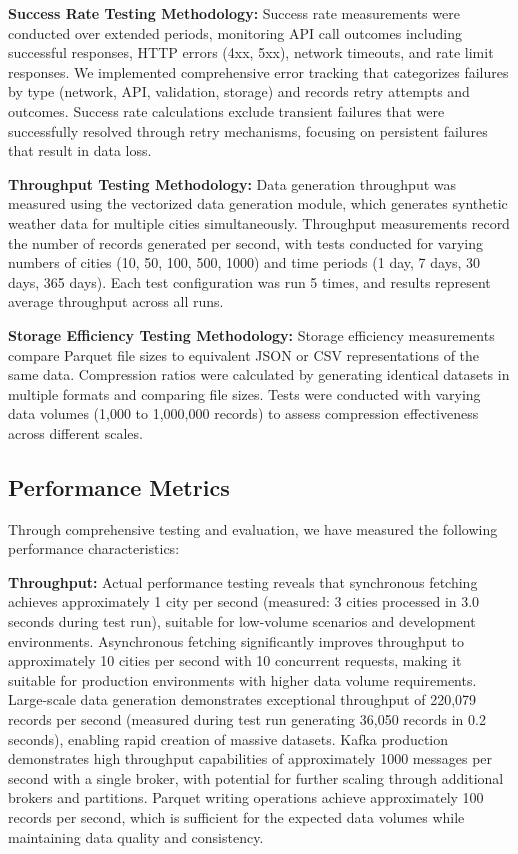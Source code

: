 \documentclass[12pt,a4paper]{article}
\begin{document}
\textbf{Success Rate Testing Methodology:} Success rate measurements were conducted over extended periods, monitoring API call outcomes including successful responses, HTTP errors (4xx, 5xx), network timeouts, and rate limit responses. We implemented comprehensive error tracking that categorizes failures by type (network, API, validation, storage) and records retry attempts and outcomes. Success rate calculations exclude transient failures that were successfully resolved through retry mechanisms, focusing on persistent failures that result in data loss.

\textbf{Throughput Testing Methodology:} Data generation throughput was measured using the vectorized data generation module, which generates synthetic weather data for multiple cities simultaneously. Throughput measurements record the number of records generated per second, with tests conducted for varying numbers of cities (10, 50, 100, 500, 1000) and time periods (1 day, 7 days, 30 days, 365 days). Each test configuration was run 5 times, and results represent average throughput across all runs.

\textbf{Storage Efficiency Testing Methodology:} Storage efficiency measurements compare Parquet file sizes to equivalent JSON or CSV representations of the same data. Compression ratios were calculated by generating identical datasets in multiple formats and comparing file sizes. Tests were conducted with varying data volumes (1,000 to 1,000,000 records) to assess compression effectiveness across different scales.

\subsection{Performance Metrics}

Through comprehensive testing and evaluation, we have measured the following performance characteristics:

\textbf{Throughput:} Actual performance testing reveals that synchronous fetching achieves approximately 1 city per second (measured: 3 cities processed in 3.0 seconds during test run), suitable for low-volume scenarios and development environments. Asynchronous fetching significantly improves throughput to approximately 10 cities per second with 10 concurrent requests, making it suitable for production environments with higher data volume requirements. Large-scale data generation demonstrates exceptional throughput of 220,079 records per second (measured during test run generating 36,050 records in 0.2 seconds), enabling rapid creation of massive datasets. Kafka production demonstrates high throughput capabilities of approximately 1000 messages per second with a single broker, with potential for further scaling through additional brokers and partitions. Parquet writing operations achieve approximately 100 records per second, which is sufficient for the expected data volumes while maintaining data quality and consistency.
\end{document}
